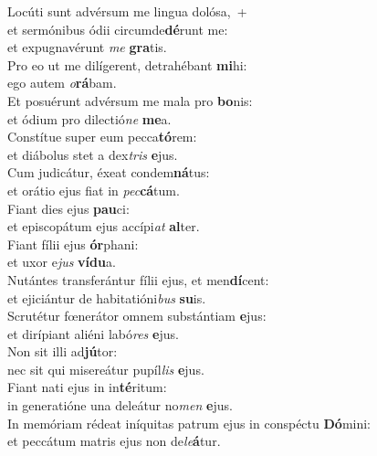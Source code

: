 \evenverse Locúti sunt advérsum me lingua dolósa,~+\\\evenverse  et sermónibus ódii circumde\textbf{dé}runt me:~\*\\
\evenverse et expugnavérunt \textit{me} \textbf{gra}tis.\\
\oddverse Pro eo ut me dilígerent, detrahébant \textbf{mi}hi:~\*\\
\oddverse ego autem \textit{o}\textbf{rá}bam.\\
\evenverse Et posuérunt advérsum me mala pro \textbf{bo}nis:~\*\\
\evenverse et ódium pro dilectió\textit{ne} \textbf{me}a.\\
\oddverse Constítue super eum pecca\textbf{tó}rem:~\*\\
\oddverse et diábolus stet a dex\textit{tris} \textbf{e}jus.\\
\evenverse Cum judicátur, éxeat condem\textbf{ná}tus:~\*\\
\evenverse et orátio ejus fiat in \textit{pec}\textbf{cá}tum.\\
\oddverse Fiant dies ejus \textbf{pau}ci:~\*\\
\oddverse et episcopátum ejus accípi\textit{at} \textbf{al}ter.\\
\evenverse Fiant fílii ejus \textbf{ór}phani:~\*\\
\evenverse et uxor e\textit{jus} \textbf{ví}\textbf{du}a.\\
\oddverse Nutántes transferántur fílii ejus, et men\textbf{dí}cent:~\*\\
\oddverse et ejiciántur de habitatióni\textit{bus} \textbf{su}is.\\
\evenverse Scrutétur fœnerátor omnem substántiam \textbf{e}jus:~\*\\
\evenverse et dirípiant aliéni labó\textit{res} \textbf{e}jus.\\
\oddverse Non sit illi ad\textbf{jú}tor:~\*\\
\oddverse nec sit qui misereátur pupíl\textit{lis} \textbf{e}jus.\\
\evenverse Fiant nati ejus in in\textbf{té}ritum:~\*\\
\evenverse in generatióne una deleátur no\textit{men} \textbf{e}jus.\\
\oddverse In memóriam rédeat iníquitas patrum ejus in conspéctu \textbf{Dó}mini:~\*\\
\oddverse et peccátum matris ejus non de\textit{le}\textbf{á}tur.\\
